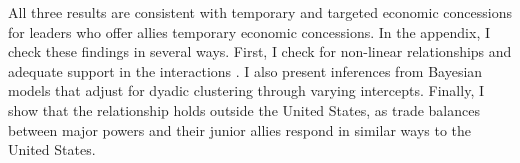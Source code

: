 \documentclass[12pt]{article}
\begin{document}
All three results are consistent with temporary and targeted economic concessions for leaders who offer allies temporary economic concessions.
In the appendix, I check these findings in several ways.
First, I check for non-linear relationships and adequate support in the interactions \citep{Hainmuelleretal2019}. 
I also present inferences from Bayesian models that adjust for dyadic clustering through varying intercepts.
Finally, I show that the relationship holds outside the United States, as trade balances between major powers and their junior allies respond in similar ways to the United States.







\newpage
\singlespace
 
 
\end{document}
